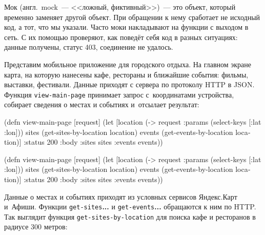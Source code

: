 \label{test-isolation}


Мок (англ.~mock~--- <<ложный, фиктивный>>)~--- это объект, который временно
заменяет другой объект. При обращении к нему сработает не исходный код, а тот,
что мы указали. Часто моки накладывают на функции с выходом в сеть. С их помощью
проверяют, как поведёт себя код в разных ситуациях: данные получены, статус 403,
соединение не удалось.

\label{mobile-app-intro}


Представим мобильное приложение для городского отдыха. На главном экране карта,
на которую нанесены кафе, рестораны и ближайшие события: фильмы, выставки,
фестивали. Данные приходят с сервера по протоколу HTTP в JSON. Функция
\verb|view-main-page| принимает запрос с~координатами устройства, собирает
сведения о местах и событиях и~отсылает результат:

\ifnarrow

\begin{english}
  \begin{clojure}
(defn view-main-page [request]
  (let [location
        (-> request
            :params
            (select-keys [:lat :lon]))
        sites
        (get-sites-by-location location)
        events
        (get-events-by-location
          location)]
    {:status 200
     :body {:sites sites
            :events events}}))
  \end{clojure}
\end{english}

\else

\begin{english}
  \begin{clojure}
(defn view-main-page [request]
  (let [location (-> request
                     :params
                     (select-keys [:lat :lon]))
        sites (get-sites-by-location location)
        events (get-events-by-location location)]
    {:status 200
     :body {:sites sites :events events}}))
  \end{clojure}
\end{english}

\fi

Данные о местах и событиях приходят из условных сервисов Яндекс.Карт
и~Афиши. Функции \verb|get-sites|\textbf{...} и \verb|get-events|\textbf{...}
обращаются к ним по HTTP. Так выглядит функция
\texttt{get\--sites\--by\--location} для поиска кафе и ресторанов в радиусе 300
метров:

